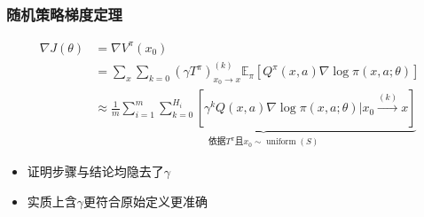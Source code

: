 \documentclass{beamer}
\begin{document}
\begin{CJK*}{GBK}{hei}
\begin{frame}\frametitle{随机策略梯度定理}
\begin{theorem}
\begin{align*}
        \nabla J(\theta)&=\nabla V^{\pi}(x_0)\\
        &=\sum_{x}\sum_{k=0}(\gamma T^{\pi})^{(k)}_{{x_0}\rightarrow x}\mathbb{E}_{\pi}\left[Q^{\pi}(x,a)\nabla \log \pi(x,a;\theta)\right]\\
        &\approx \underbrace{\frac{1}{m}\sum_{i=1}^{m}\sum_{k=0}^{H_{i}}\left[\gamma^k Q(x,a)\nabla \log \pi(x, a ; \theta)|x_0\stackrel{(k)}{\longrightarrow}x\right]}_{\text{依据}T^{\pi}\text{且}x_0\sim \operatorname{uniform}(S)}
\end{align*}
\begin{itemize}
\item \citep{sutton2018reinforcement}证明步骤与结论均隐去了$\gamma$
\item 实质上含$\gamma$更符合原始定义更准确
\end{itemize}
\end{theorem}
\end{frame}


\end{CJK*}
\end{document}

